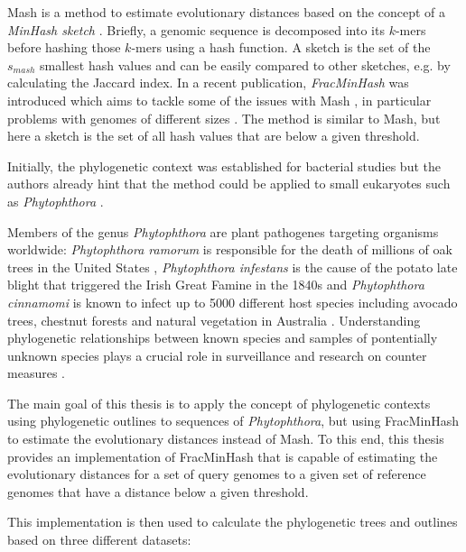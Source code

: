 Mash is a method to estimate evolutionary distances based on the concept of a
\textit{MinHash sketch}
\cite{broderResemblanceContainmentDocuments1998a,ondovMashFastGenome2016}.
Briefly, a genomic sequence is decomposed into its $k$-mers before hashing those
$k$-mers using a hash function. A sketch is the set of the $s_{mash}$ smallest
hash values and can be easily compared to other sketches, e.g. by calculating
the Jaccard index. In a recent publication, \textit{FracMinHash} was introduced
which aims to tackle some of the issues with Mash
\cite{irberLightweightCompositionalAnalysis2022}, in particular problems with
genomes of different sizes
\cite{heraDerivingConfidenceIntervals2023,irberLightweightCompositionalAnalysis2022}.
The method is similar to Mash, but here a sketch is the set of all hash values
that are below a given threshold.

Initially, the phylogenetic context was established for bacterial studies but
the authors already hint that the method could be applied to small eukaryotes
such as \textit{Phytophthora} \cite{bagciMicrobialPhylogeneticContext2021}.

Members of the genus \textit{Phytophthora} are plant pathogenes targeting
organisms worldwide: \textit{Phytophthora ramorum} is responsible for the death
of millions of oak trees in the United States
\cite{cobbMagnitudeRegionalScaleTree2020}, \textit{Phytophthora infestans} is
the cause of the potato late blight that triggered the Irish Great Famine in the
1840s \cite{yoshidaRiseFallPhytophthora2013} and \textit{Phytophthora cinnamomi}
is known to infect up to 5000 different host species including avocado trees,
chestnut forests and natural vegetation in Australia
\cite{hardhamPhytophthoraCinnamomi2018}. Understanding phylogenetic
relationships between known species and samples of pontentially unknown species
plays a crucial role in surveillance and research on counter measures
\cite{piomboMetagenomicsApproachesDetection2021}.


The main goal of this thesis is to apply the concept of phylogenetic contexts
using phylogenetic outlines to sequences of \textit{Phytophthora}, but using
FracMinHash to estimate the evolutionary distances instead of Mash. To this end,
this thesis provides an implementation of FracMinHash that is capable of
estimating the evolutionary distances for a set of query genomes to a given set
of reference genomes that have a distance below a given threshold.

This implementation is then used to calculate the phylogenetic trees and
outlines based on three different datasets:

